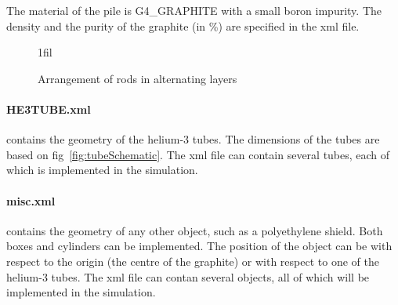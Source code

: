 \documentclass{article}
\makeatletter
\newcommand*{\centerfloat}{%
  \parindent \z@
  \leftskip \z@ \@plus 1fil \@minus \textwidth
  \rightskip\leftskip
  \parfillskip \z@skip}
\makeatother
\begin{document}
	The material of the pile is G4\_GRAPHITE with a small boron impurity. The density and the purity of the graphite (in \%) are specified in the xml file.


\begin{figure}
	\centerfloat
	\caption{Arrangement of rods in alternating layers}	
	\label{fig:layers}
\end{figure}


	\paragraph{HE3TUBE.xml} contains the geometry of the helium-3 tubes. The dimensions of the tubes are based on fig~\ref{fig:tubeSchematic}. The xml file can contain several tubes, each of which is implemented in the simulation.



	\paragraph{misc.xml} contains the geometry of any other object, such as a polyethylene shield. Both boxes and cylinders can be implemented. The position of the object can be with respect to the origin (the centre of the graphite) or with respect to one of the helium-3 tubes. The xml file can contan several objects, all of which will be implemented in the simulation.
\end{document}
